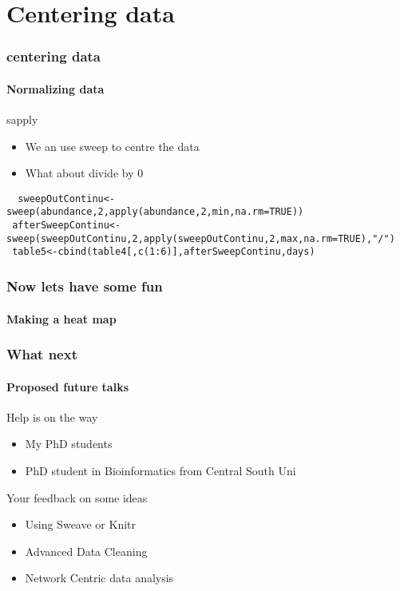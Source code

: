 \documentclass[12pt]{beamer}\usepackage[]{graphicx}\usepackage[]{color}
\begin{document}
\section*{Centering data}
\begin{frame}[fragile]
  \frametitle{centering data}
  \framesubtitle{Normalizing data}
  \begin{block}{sapply}
  \begin{itemize}
  \item We an use sweep to centre the data
  \item What about divide by 0
  \end{itemize}
  \end{block}
  \begin{lstlisting}
  sweepOutContinu<-sweep(abundance,2,apply(abundance,2,min,na.rm=TRUE))	
 afterSweepContinu<-sweep(sweepOutContinu,2,apply(sweepOutContinu,2,max,na.rm=TRUE),"/") 
 table5<-cbind(table4[,c(1:6)],afterSweepContinu,days)
  \end{lstlisting}
\end{frame}



\begin{frame}
  \frametitle{Now lets have some fun}
  \framesubtitle{Making a heat map}
\end{frame}

\begin{frame}
  \frametitle{What next}
  \framesubtitle{Proposed future talks}
  \begin{block}{Help is on the way}
  \begin{itemize}
  \item My PhD students
  \item PhD student in Bioinformatics from Central South Uni
  \end{itemize}
  \end{block}
  \begin{block}{Your feedback on some ideas}
  \begin{itemize}
  \item Using Sweave or Knitr
  \item Advanced Data Cleaning 
  \item Network Centric data analysis
  \end{itemize}
  \end{block}
\end{frame}
\end{document}
